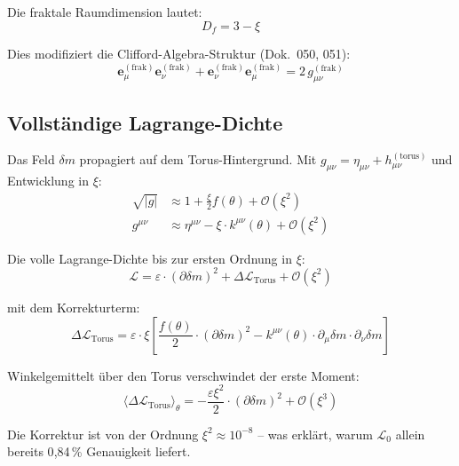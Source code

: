 Die fraktale Raumdimension lautet:
\begin{equation}
    D_f = 3 - \xi
\end{equation}

Dies modifiziert die Clifford-Algebra-Struktur (Dok.~050, 051):
\begin{equation}
    \mathbf{e}_\mu^{(\mathrm{frak})} \mathbf{e}_\nu^{(\mathrm{frak})}
    + \mathbf{e}_\nu^{(\mathrm{frak})} \mathbf{e}_\mu^{(\mathrm{frak})}
    = 2\, g_{\mu\nu}^{(\mathrm{frak})}
\end{equation}

\subsection{Vollständige Lagrange-Dichte}

Das Feld $\delta m$ propagiert auf dem Torus-Hintergrund. Mit
$g_{\mu\nu} = \eta_{\mu\nu} + h_{\mu\nu}^{(\mathrm{torus})}$
und Entwicklung in $\xi$:
\begin{align}
    \sqrt{|g|} &\approx 1 + \frac{\xi}{2} f(\theta) + \mathcal{O}(\xi^2) \\
    g^{\mu\nu} &\approx \eta^{\mu\nu} - \xi \cdot k^{\mu\nu}(\theta)
    + \mathcal{O}(\xi^2)
\end{align}

Die volle Lagrange-Dichte bis zur ersten Ordnung in $\xi$:
\begin{equation}
    \mathcal{L} = \varepsilon \cdot (\partial\delta m)^2
    + \Delta\mathcal{L}_{\mathrm{Torus}} + \mathcal{O}(\xi^2)
\end{equation}

mit dem Korrekturterm:
\begin{equation}
    \boxed{
    \Delta\mathcal{L}_{\mathrm{Torus}} = \varepsilon \cdot \xi \left[
    \frac{f(\theta)}{2} \cdot (\partial\delta m)^2
    - k^{\mu\nu}(\theta) \cdot \partial_\mu\delta m \cdot \partial_\nu\delta m
    \right]
    }
    \label{eq:deltaL}
\end{equation}

Winkelgemittelt über den Torus verschwindet der erste Moment:
\begin{equation}
    \langle \Delta\mathcal{L}_{\mathrm{Torus}} \rangle_\theta
    = -\frac{\varepsilon \xi^2}{2} \cdot (\partial\delta m)^2
    + \mathcal{O}(\xi^3)
\end{equation}

Die Korrektur ist von der Ordnung $\xi^2 \approx 10^{-8}$ -- was erklärt,
warum $\mathcal{L}_0$ allein bereits 0{,}84\,\% Genauigkeit liefert.


